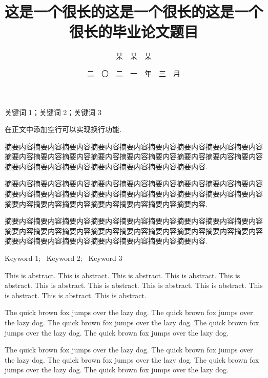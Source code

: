 \documentclass[master]{shnuthesis}
\title{这是一个很长的这是一个很长的这是一个很长的毕业论文题目}
\author{某~~某~~某}     %
\date{二~~〇~~二~~一~~年~~三~~月 }  %
\begin{document}
\frontmatter

\maketitle


% 

\makestatement


\clearpage   %



\begin{cnabstract}{关键词 1；关键词 2；关键词 3}

在正文中添加空行可以实现换行功能.

摘要内容摘要内容摘要内容摘要内容摘要内容摘要内容摘要内容摘要内容摘要内容摘要内容摘要内容摘要内容摘要内容摘要内容摘要内容摘要内容摘要内容摘要内容摘要内容摘要内容摘要内容摘要内容摘要内容摘要内容摘要内容.

摘要内容摘要内容摘要内容摘要内容摘要内容摘要内容摘要内容摘要内容摘要内容摘要内容摘要内容摘要内容摘要内容摘要内容摘要内容摘要内容摘要内容摘要内容摘要内容摘要内容摘要内容摘要内容摘要内容摘要内容摘要内容.

摘要内容摘要内容摘要内容摘要内容摘要内容摘要内容摘要内容摘要内容摘要内容摘要内容摘要内容摘要内容摘要内容摘要内容摘要内容摘要内容摘要内容摘要内容摘要内容摘要内容摘要内容摘要内容摘要内容摘要内容摘要内容.


\end{cnabstract}



\begin{enabstract}{Keyword 1;~ Keyword 2;~ Keyword 3}

This is abstract. This is abstract. This is abstract. This is abstract. This is abstract. This is abstract. This is abstract. This is abstract. This is abstract. This is abstract. This is abstract. This is abstract.

The quick brown fox jumps over the lazy dog. The quick brown fox jumps over the lazy dog. The quick brown fox jumps over the lazy dog. The quick brown fox jumps over the lazy dog. The quick brown fox jumps over the lazy dog.

The quick brown fox jumps over the lazy dog. The quick brown fox jumps over the lazy dog. The quick brown fox jumps over the lazy dog. The quick brown fox jumps over the lazy dog. The quick brown fox jumps over the lazy dog.


\end{enabstract}
\end{document}
